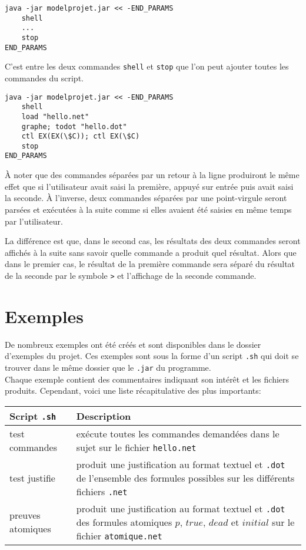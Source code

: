 \documentclass[dvipsnames]{report}
\begin{document}
\begin{verbatim}
java -jar modelprojet.jar << -END_PARAMS
    shell
    ...
    stop
END_PARAMS
\end{verbatim}

C'est entre les deux commandes \texttt{shell} et \texttt{stop} que l'on peut ajouter toutes les commandes du script.

\begin{verbatim}
java -jar modelprojet.jar << -END_PARAMS
    shell
    load "hello.net"
    graphe; todot "hello.dot"
    ctl EX(EX(\$C)); ctl EX(\$C)
    stop
END_PARAMS
\end{verbatim}

\`{A} noter que des commandes séparées par un retour à la ligne produiront le même effet que si l'utilisateur avait saisi la première, appuyé sur entrée puis avait saisi la seconde. \`{A} l'inverse, deux commandes séparées par une point-virgule seront parsées et exécutées à la suite comme si elles avaient été saisies en même temps par l'utilisateur.

La différence est que, dans le second cas, les résultats des deux commandes seront affichés à la suite sans savoir quelle commande a produit quel résultat. Alors que dans le premier cas, le résultat de la première commande sera séparé du résultat de la seconde par le symbole \texttt{>} et l'affichage de la seconde commande.

\section{Exemples}

De nombreux exemples ont été créés et sont disponibles dans le dossier d'exemples du projet. Ces exemples sont sous la forme d'un script \texttt{.sh} qui doit se trouver dans le même dossier que le \texttt{.jar} du programme.\\

Chaque exemple contient des commentaires indiquant son intérêt et les fichiers produits. Cependant, voici une liste récapitulative des plus importants:\\

\noindent\begin{tabularx}{\linewidth}{| @{}l | X@{} |}
\hline
Script \texttt{.sh} & Description \\
\hline
test commandes & exécute toutes les commandes demandées dans le sujet sur le fichier \texttt{hello.net} \\
\hline
test justifie & produit une justification au format textuel et \texttt{.dot} de l'ensemble des formules possibles sur les différents fichiers \texttt{.net} \\
\hline
preuves atomiques & produit une justification au format textuel et \texttt{.dot} des formules atomiques $p$, $true$, $dead$ et $initial$ sur le fichier \texttt{atomique.net} \\
\hline
\end{tabularx}
\end{document}
